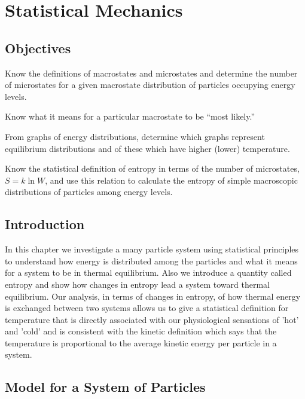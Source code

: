 \chapter{Statistical Mechanics} 
\label{chapter:stat-mech}

\section*{Objectives}
\begin{objectives}

\item Know the definitions of macrostates and microstates and
determine the number of microstates for a given macrostate
distribution of particles occupying energy levels.

\item Know what it means for a particular macrostate to be ``most likely.''

\item From graphs of energy distributions, determine which graphs
represent equilibrium distributions and of these which have higher
(lower) temperature.

\item Know the statistical definition of entropy in terms of the
number of microstates, $S = k \ln W$, and use this relation to calculate
the entropy of simple macroscopic distributions of particles among
energy levels.

\end{objectives}


\section{Introduction}

In this chapter we investigate a many particle system using
statistical principles to understand how energy is distributed among
the particles and what it means for a system to be in thermal
equilibrium.  Also we introduce a quantity called entropy and show how
changes in entropy lead a system toward thermal equilibrium.  Our
analysis, in terms of changes in entropy, of how thermal energy is
exchanged between two systems allows us to give a statistical
definition for temperature that is directly associated with our
physiological sensations of 'hot' and 'cold' and is consistent with
the kinetic definition which says that the temperature is proportional
to the average kinetic energy per particle in a system.
    
    
\section{Model for a System of Particles}
     
